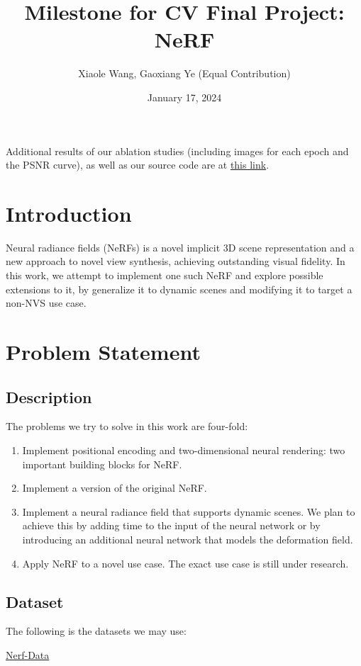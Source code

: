 \documentclass{article}
\title{Milestone for CV Final Project: NeRF}
\author{Xiaole Wang, Gaoxiang Ye (Equal Contribution)}
\date{January 17, 2024}
\begin{document}
\maketitle

\noindent
Additional results of our ablation studies (including images for each epoch and the PSNR curve), as well as our source code are at \href{https://disk.pku.edu.cn:443/link/98B88C53485C115705BB68F410388AD6}{this link}.

\section{Introduction}
Neural radiance fields (NeRFs) is a novel implicit 3D scene representation and a new approach to novel view synthesis, achieving outstanding visual fidelity. In this work, we attempt to implement one such NeRF and explore possible extensions to it, by generalize it to dynamic scenes and modifying it to target a non-NVS use case.

\section{Problem Statement}
\subsection{Description}
The problems we try to solve in this work are four-fold:
\begin{enumerate}
    \item Implement positional encoding and two-dimensional neural rendering: two important building blocks for NeRF.
    \item Implement a version of the original NeRF.
    \item Implement a neural radiance field that supports dynamic scenes. We plan to achieve this by adding time to the input of the neural network or by introducing an additional neural network that models the deformation field.
    \item Apply NeRF to a novel use case. The exact use case is still under research.
\end{enumerate}

\subsection{Dataset}

The following is the datasets we may use:

\href{https://drive.google.com/drive/folders/128yBriW1IG_3NJ5Rp7APSTZsJqdJdfc1}{Nerf-Data}
\end{document}
